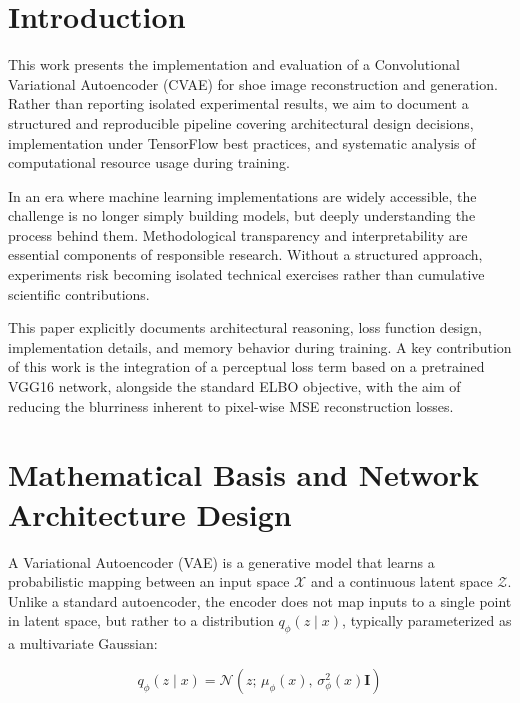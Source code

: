 \documentclass[11pt,a4paper]{article}
\begin{document}
\newpage

\renewcommand{\contentsname}{Table of Contents}
\tableofcontents
\newpage

\section{Introduction}

This work presents the implementation and evaluation of a Convolutional Variational Autoencoder (CVAE) for shoe image reconstruction and generation. Rather than reporting isolated experimental results, we aim to document a structured and reproducible pipeline covering architectural design decisions, implementation under TensorFlow best practices, and systematic analysis of computational resource usage during training.

In an era where machine learning implementations are widely accessible, the challenge is no longer simply building models, but deeply understanding the process behind them. Methodological transparency and interpretability are essential components of responsible research. Without a structured approach, experiments risk becoming isolated technical exercises rather than cumulative scientific contributions.

This paper explicitly documents architectural reasoning, loss function design, implementation details, and memory behavior during training. A key contribution of this work is the integration of a perceptual loss term based on a pretrained VGG16 network, alongside the standard ELBO objective, with the aim of reducing the blurriness inherent to pixel-wise MSE reconstruction losses.

\section{Mathematical Basis and Network Architecture Design}

A Variational Autoencoder (VAE) is a generative model that learns a probabilistic mapping between an input space $\mathcal{X}$ and a continuous latent space $\mathcal{Z}$. Unlike a standard autoencoder, the encoder does not map inputs to a single point in latent space, but rather to a distribution $q_\phi(z \mid x)$, typically parameterized as a multivariate Gaussian:

\begin{equation}
    q_\phi(z \mid x) = \mathcal{N}(z;\, \mu_\phi(x),\, \sigma^2_\phi(x) \mathbf{I})
\end{equation}
\end{document}
